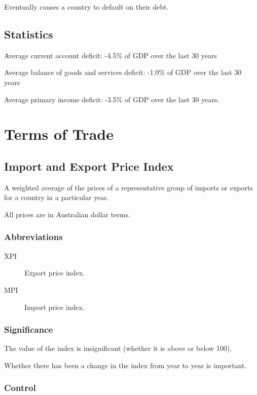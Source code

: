\documentclass[a4paper,11pt]{report}
\begin{document}
Eventually causes a country to default on their debt.


\section{Statistics}

Average current account deficit: -4.5\% of GDP over the last 30 years

Average balance of goods and services deficit: -1.0\% of GDP over the last 30
years

Average primary income deficit: -3.5\% of GDP over the last 30 years.




\chapter{Terms of Trade}

\section{Import and Export Price Index}

A weighted average of the prices of a representative group of imports or
exports for a country in a particular year.

All prices are in Australian dollar terms.

\subsection{Abbreviations}

\begin{description}
\item [XPI] Export price index.
\item [MPI] Import price index.
\end{description}

\subsection{Significance}

The value of the index is insignificant (whether it is above or below 100).

Whether there has been a change in the index from year to year is important.

\subsection{Control}
\end{document}

